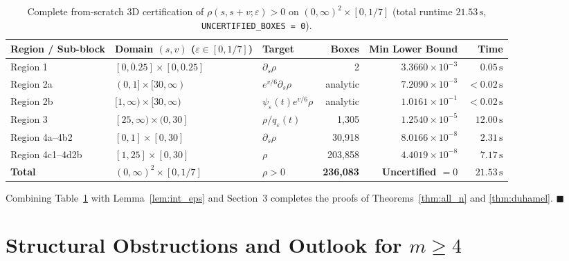 \documentclass[11pt,a4paper]{article}
\theoremstyle{remark}
\begin{document}
\begin{table}[!htbp]
\centering
\caption{Complete from-scratch 3D certification of $\rho(s,s+v;\varepsilon)>0$ on $(0,\infty)^2\times[0,1/7]$ (total runtime $21.53\,\mathrm{s}$, \texttt{UNCERTIFIED\_BOXES = 0}).}
\label{tab:3d_cert}
\begin{tabularx}{\linewidth}{lXlrrr}
\toprule
Region / Sub-block & Domain $(s,v)$ ($\varepsilon\in[0,1/7]$) & Target & Boxes & Min Lower Bound & Time \\
\midrule
Region 1 & $[0,0.25]\times[0,0.25]$ & $\partial_s\rho$ & 2 & $3.3660\times 10^{-3}$ & $0.05\,\mathrm{s}$ \\
Region 2a & $(0,1]\times[30,\infty)$ & $e^{v/6}\partial_s\rho$ & analytic & $7.2090\times 10^{-3}$ & $<0.02\,\mathrm{s}$ \\
Region 2b & $[1,\infty)\times[30,\infty)$ & $\psi_\varepsilon(t)e^{v/6}\rho$ & analytic & $1.0161\times 10^{-1}$ & $<0.02\,\mathrm{s}$ \\
Region 3 & $[25,\infty)\times(0,30]$ & $\rho/q_\varepsilon(t)$ & 1,305 & $1.2540\times 10^{-5}$ & $12.00\,\mathrm{s}$ \\
Region 4a--4b2 & $[0,1]\times[0,30]$ & $\partial_s\rho$ & 30,918 & $8.0166\times 10^{-8}$ & $2.31\,\mathrm{s}$ \\
Region 4c1--4d2b & $[1,25]\times[0,30]$ & $\rho$ & 203,858 & $4.4019\times 10^{-8}$ & $7.17\,\mathrm{s}$ \\
\midrule
\textbf{Total} & \textbf{$(0,\infty)^2\times[0,1/7]$} & \textbf{$\rho > 0$} & \textbf{236,083} & \textbf{Uncertified $= 0$} & \textbf{$21.53\,\mathrm{s}$} \\
\bottomrule
\end{tabularx}
\end{table}

Combining Table~\ref{tab:3d_cert} with Lemma~\ref{lem:int_eps} and Section~3 completes the proofs of Theorems~\ref{thm:all_n} and \ref{thm:duhamel}. $\blacksquare$

\section{Structural Obstructions and Outlook for $m\ge 4$}
\end{document}
